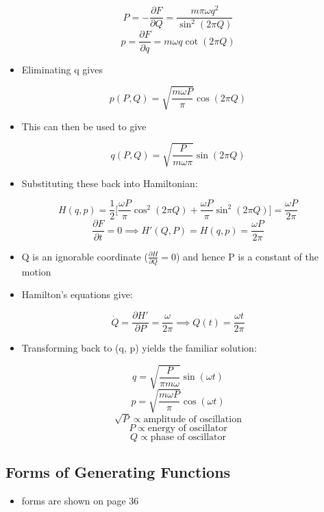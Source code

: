 \documentclass[a4paper,11pt,normalem]{article}
\begin{document}
\begin{example}
\[
    P = -\frac{\partial F}{\partial Q} = \frac{m\pi\omega q^2}{\sin^2(2\pi Q)} \]
\[
    p = \frac{\partial F}{\partial q} = m\omega q\cot(2\pi Q)
\]

\begin{itemize}
\item
  Eliminating q gives
\end{itemize}

\[
    p(P, Q) = \sqrt{\frac{m\omega P}{\pi}}\cos(2\pi Q)
\]

\begin{itemize}
\item
  This can then be used to give
\end{itemize}

\[
    q(P, Q) = \sqrt{\frac{P}{m\omega\pi}} \sin(2\pi Q)
\]

\begin{itemize}
\item
  Substituting these back into Hamiltonian:
\end{itemize}

\[
    H(q, p) = \frac{1}{2}\Big[\frac{\omega P}{\pi}\cos^2(2\pi Q) + \frac{\omega P}{\pi} \sin^2(2\pi Q)\Big] = \frac{\omega P}{2\pi} \]
\[
    \frac{\partial F}{\partial t} = 0 \implies H'(Q, P) = H(q, p) = \frac{\omega P}{2\pi}
\]

\begin{itemize}
\item
  Q is an ignorable coordinate (\(\frac{\partial H}{\partial Q} = 0\))
  and hence P is a constant of the motion
\item
  Hamilton's equations give:
\end{itemize}

\[
    \dot{Q} = \frac{\partial H'}{\partial P} = \frac{\omega}{2\pi} \implies Q(t) = \frac{\omega t}{2\pi}
\]

\begin{itemize}
\item
  Transforming back to (q, p) yields the familiar solution:
\end{itemize}

\[
    q = \sqrt{\frac{P}{\pi m \omega}}\sin(\omega t) \] \[
    p = \sqrt{\frac{m\omega P}{\pi}}\cos(\omega t) \] \[
    \sqrt{P} \propto \text{amplitude of oscillation} \] \[
    P \propto \text{energy of oscillator} \] \[
    Q \propto \text{phase of oscillator}
\]
\end{example}

\subsection{Forms of Generating Functions}\label{forms-of-generating-functions}
\begin{itemize}
\item
  forms are shown on page 36
\end{itemize}
\end{document}
